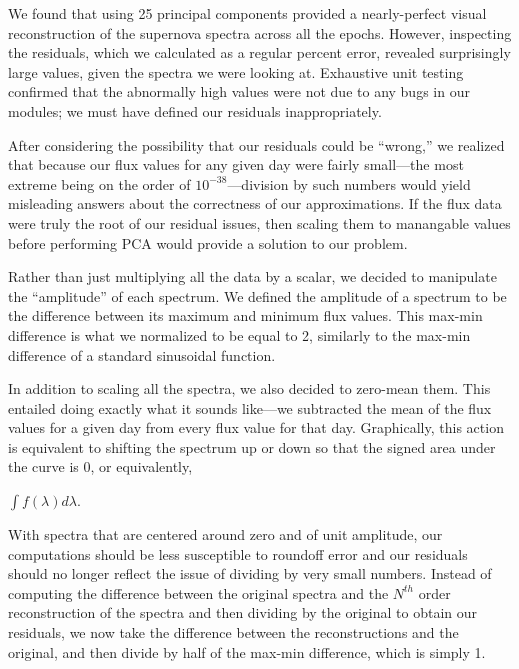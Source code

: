 \documentclass{article}
\begin{document}
We found that using 25 principal components provided a nearly-perfect
visual reconstruction of the supernova spectra across all the epochs.
However, inspecting the residuals, which we calculated as a regular
percent error, revealed surprisingly large values, given the spectra
we were looking at.  Exhaustive unit testing confirmed that the
abnormally high values were not due to any bugs in our modules; we
must have defined our residuals inappropriately.

After considering the possibility that our residuals could be
``wrong,'' we realized that because our flux values for any given day
were fairly small---the most extreme being on the order of
$10^{-38}$---division by such numbers would yield misleading answers
about the correctness of our approximations.  If the flux data were
truly the root of our residual issues, then scaling them to manangable
values before performing PCA would provide a solution to our problem.

Rather than just multiplying all the data by a scalar, we decided to
manipulate the ``amplitude'' of each spectrum.  We defined the
amplitude of a spectrum to be the difference between its maximum and
minimum flux values.  This max-min difference is what we normalized to
be equal to 2, similarly to the max-min difference of a standard
sinusoidal function.

In addition to scaling all the spectra, we also decided to zero-mean
them.  This entailed doing exactly what it sounds like---we subtracted
the mean of the flux values for a given day from every flux value for
that day.  Graphically, this action is equivalent to shifting the
spectrum up or down so that the signed area under the curve is 0, or
equivalently,

\vspace{2.5mm}

\begin{math}
  \int f(\lambda)d\lambda
\end{math}.

With spectra that are centered around zero and of unit amplitude,
our computations should be less susceptible to roundoff error and our
residuals should no longer reflect the issue of dividing by very small
numbers.  Instead of computing the difference between the original
spectra and the $N^{th}$ order reconstruction of the spectra and then
dividing by the original to obtain our residuals, we now take the
difference between the reconstructions and the original, and then
divide by half of the max-min difference, which is simply 1.
\end{document}
